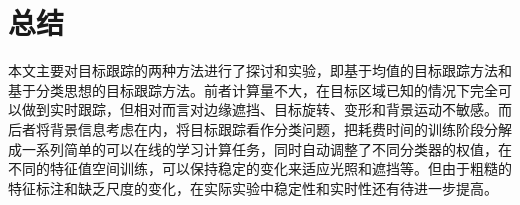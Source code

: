 \section{总结}
本文主要对目标跟踪的两种方法进行了探讨和实验，即基于均值的目标跟踪方法和基于分类思想的目标跟踪方法。前者计算量不大，在目标区域已知的情况下完全可以做到实时跟踪，但相对而言对边缘遮挡、目标旋转、变形和背景运动不敏感。而后者将背景信息考虑在内，将目标跟踪看作分类问题，把耗费时间的训练阶段分解成一系列简单的可以在线的学习计算任务，同时自动调整了不同分类器的权值，在不同的特征值空间训练，可以保持稳定的变化来适应光照和遮挡等。但由于粗糙的特征标注和缺乏尺度的变化，在实际实验中稳定性和实时性还有待进一步提高。
